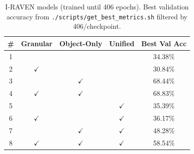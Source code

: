 \begin{table}[h]
\centering
\begin{tabular}{|c|c|c|c|c|}
\hline
\# & Granular & Object-Only & Unified & Best Val Acc \\
\hline
1 &  &  &  & 34.38\% \\
\hline
2 & $\checkmark$ &  &  & 30.84\% \\
\hline
3 &  & $\checkmark$ &  & 68.44\% \\
\hline
4 & $\checkmark$ & $\checkmark$ &  & 68.83\% \\
\hline
5 &  &  & $\checkmark$ & 35.39\% \\
\hline
6 & $\checkmark$ &  & $\checkmark$ & 36.17\% \\
\hline
7 &  & $\checkmark$ & $\checkmark$ & 48.28\% \\
\hline
8 & $\checkmark$ & $\checkmark$ & $\checkmark$ & 58.54\% \\
\hline
\end{tabular}
\caption{I-RAVEN models (trained until 406 epochs). Best validation accuracy from \texttt{./scripts/get\_best\_metrics.sh} filtered by 406/checkpoint.}
\end{table}

